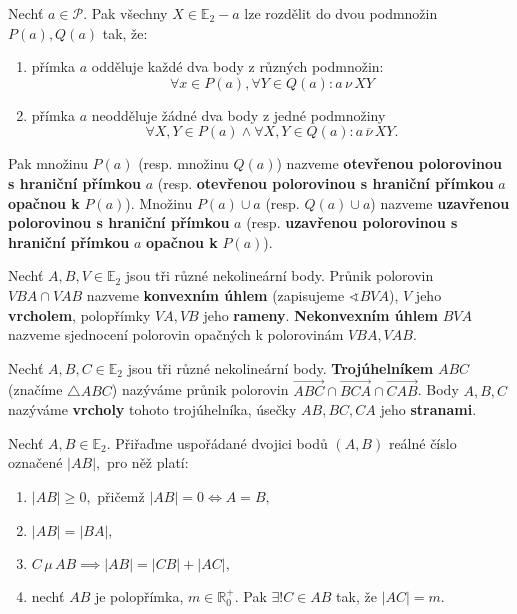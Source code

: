 \begin{definition}
  Nechť $a \in \mathscr P$. Pak všechny $X\in \mathbb E_2 - a$ lze rozdělit do dvou podmnožin $P(a), Q(a)$ tak, že:
  \begin{enumerate}[$i.$]
    \item přímka $a$ odděluje každé dva body z různých podmnožin:
      \[
        \forall x \in P(a), \forall Y \in Q(a): a \, \nu \, XY
      \]
    \item přímka $a$ neodděluje žádné dva body z jedné podmnožiny
      \[
        \forall X, Y \in P(a) \land \forall X,Y \in Q(a): a \,\overline \nu\, XY.
      \]
  \end{enumerate}
  Pak množinu $P(a)$ (resp. množinu $Q(a)$) nazveme \textbf{otevřenou polorovinou s hraniční přímkou} $a$ (resp. \textbf{otevřenou polorovinou s hraniční přímkou} $a$ \textbf{opačnou k} $P(a)$). Množinu $P(a)\cup a$ (resp. $Q(a) \cup a$) nazveme \textbf{uzavřenou polorovinou s hraniční přímkou} $a$ (resp. \textbf{uzavřenou polorovinou s hraniční přímkou} $a$ \textbf{opačnou k} $P(a)$).
\end{definition}

\begin{definition}
  Nechť $A,B,V \in \mathbb E_2$ jsou tři různé nekolineární body. Průnik polorovin $VBA \cap VAB$ nazveme \textbf{konvexním úhlem} (zapisujeme $\sphericalangle BVA$), $V$ jeho \textbf{vrcholem}, polopřímky $VA, VB$ jeho \textbf{rameny}. \textbf{Nekonvexním úhlem} $BVA$ nazveme sjednocení polorovin opačných k polorovinám $VBA,VAB.$
\end{definition}

\begin{definition}
  Nechť $A,B,C\in \mathbb E_2$ jsou tři různé nekolineární body. \textbf{Trojúhelníkem} $ABC$ (značíme $\triangle ABC$) nazýváme průnik polorovin $\overrightarrow{ABC} \cap \overrightarrow{BCA} \cap \overrightarrow{CAB}$. Body $A,B,C$ nazýváme \textbf{vrcholy} tohoto trojúhelníka, úsečky $AB, BC, CA$ jeho \textbf{stranami}.
\end{definition}

\begin{definition}
  Nechť $A,B\in \mathbb E_2.$ Přiřaďme uspořádané dvojici bodů $(A,B)$ reálné číslo označené $|AB|,$ pro něž platí:
  \begin{enumerate}[$i.$]
    \item $|AB|\geq 0,$ přičemž $|AB|=0 \iff A=B,$
    \item $|AB|=|BA|,$
    \item $C\, \mu \, AB \implies |AB|=|CB|+|AC|,$
    \item nechť $AB$ je polopřímka, $m\in \mathbb R^+_0.$ Pak $\exists ! C\in AB$ tak, že $|AC|=m.$
  \end{enumerate}
\end{definition}

